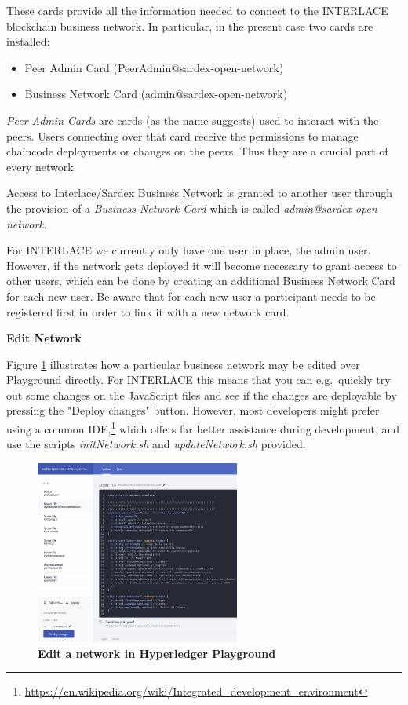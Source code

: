 These cards provide all the information needed to connect to the INTERLACE blockchain business network. In particular, in the present case two cards are installed:

\begin{itemize}
	\item Peer Admin Card (PeerAdmin@sardex-open-network)
	\item Business Network Card (admin@sardex-open-network)
\end{itemize}

\textit{Peer Admin Cards} are cards (as the name suggests) used to interact with the peers. Users connecting over that card receive the permissions to manage chaincode deployments or changes on the peers. Thus they are a crucial part of every network.

Access to Interlace/Sardex Business Network is granted to another user through the provision of a \textit{Business Network Card} which is called \textit{admin@sardex-open-network}.

For INTERLACE we currently only have one user in place, the admin user. However, if the network gets deployed it will become necessary to grant access to other users, which can be done by creating an additional Business Network Card for each new user. Be aware that for each new user a participant needs to be registered first in order to link it with a new network card. 

\textbf{Edit Network}

Figure \ref{fig:edit-network} illustrates how a particular business network may be edited over Playground directly. For INTERLACE this means that you can e.g.\ quickly try out some changes on the JavaScript files and see if the changes are deployable by pressing the "Deploy changes" button. However, most developers might prefer using a common IDE,\footnote{\url{https://en.wikipedia.org/wiki/Integrated_development_environment}} which offers far better assistance during development, and use the scripts \textit{initNetwork.sh} and \textit{updateNetwork.sh} provided.

\begin{figure}[htbp]
  \centering
  \includegraphics[width=0.6\textwidth]{Figures/edit-network}
  \caption{\bf\small Edit a network in Hyperledger Playground}
  \label{fig:edit-network}
\end{figure}

